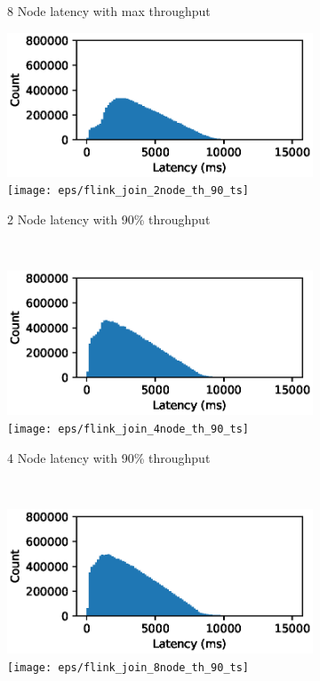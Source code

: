 \begin{figure}
\begin{subfigure}[b]{0.3\textwidth}
       \caption{8 Node latency with max throughput }
   \end{subfigure}




   \begin{subfigure}[b]{0.3\textwidth}
       \includegraphics[width=\textwidth]{eps/flink_join_2node_th_90_hist}
        \texttt{[image: eps/flink\_join\_2node\_th\_90\_ts]}

       \caption{2 Node latency with 90\% throughput }
   \end{subfigure}
   ~ 
   \begin{subfigure}[b]{0.3\textwidth}
       \includegraphics[width=\textwidth]{eps/flink_join_4node_th_90_hist}
        \texttt{[image: eps/flink\_join\_4node\_th\_90\_ts]}

       \caption{4 Node latency with 90\% throughput }
   \end{subfigure}
   ~ 
   \begin{subfigure}[b]{0.3\textwidth}
       \includegraphics[width=\textwidth]{eps/flink_join_8node_th_90_hist}
        \texttt{[image: eps/flink\_join\_8node\_th\_90\_ts]}


\end{subfigure}
\end{figure}
